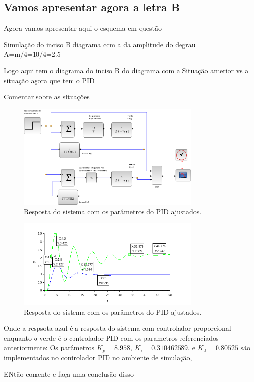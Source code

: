 \subsection{Vamos apresentar agora a letra B}

Agora vamos apresentar aqui o esquema em questão

Simulação do inciso B diagrama com a da amplitude  do degrau A=m/4=10/4=2.5

Logo aqui tem o diagrama do inciso B do diagrama com a Situação anterior vs a situação agora que tem o PID

Comentar sobre as situações


\begin{figure}[H]
    \centering
    \includegraphics[width=0.8\textwidth]{6-atividade/assets/b/diagrama-comparacao-proporcional-pid.png}
    \caption{Resposta do sistema com os parâmetros do PID ajustados.}
    \label{fig:diagrama-comparacao-proporcional-pid}
\end{figure}

\begin{figure}[H]
    \centering
    \includegraphics[width=0.8\textwidth]{6-atividade/assets/b/comparacao-proporcional-pid.png}
    \caption{Resposta do sistema com os parâmetros do PID ajustados.}
    \label{fig:comparacao-proporcional-pid}
\end{figure}

Onde a respsota azul é a resposta do sistema com controlador proporcional enquanto o verde é o controlador PID com os parametros referenciados anteriormente:
Os parâmetros \( K_p = 8.958 \), \( K_i = 0.310462589 \), e \( K_d = 0.80525 \) são implementados no controlador PID no ambiente de simulação,


ENtão comente e faça uma conclusão disso